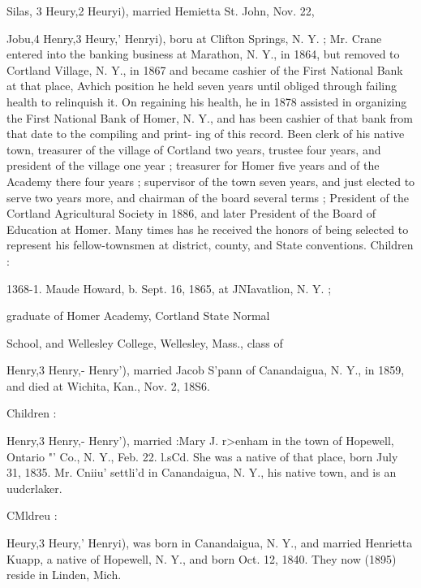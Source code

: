 \documentclass{book}
\begin{document}
Silas, 3 Heury,2 Heuryi), married Hemietta St. John, Nov. 22, 


Jobu,4 Henry,3 Heury,' Henryi), boru at Clifton Springs, N. Y. ; 
Mr. Crane entered into the banking business at Marathon, N. Y., 
in 1864, but removed to Cortland Village, N. Y., in 1867 and 
became cashier of the First National Bank at that place, Avhich 
position he held seven years until obliged through failing health 
to relinquish it. On regaining his health, he in 1878 assisted in 
organizing the First National Bank of Homer, N. Y., and has 
been cashier of that bank from that date to the compiling and print- 
ing of this record. Been clerk of his native town, treasurer of 
the village of Cortland two years, trustee four years, and president 
of the village one year ; treasurer for Homer five years and of the 
Academy there four years ; supervisor of the town seven years, 
and just elected to serve two years more, and chairman of the 
board several terms ; President of the Cortland Agricultural 
Society in 1886, and later President of the Board of Education 
at Homer. Many times has he received the honors of being 
selected to represent his fellow-townsmen at district, county, and 
State conventions. Children : 

1368-1. Maude Howard, b. Sept. 16, 1865, at JNIavatlion, N. Y. ; 

graduate of Homer Academy, Cortland State Normal 

School, and Wellesley College, Wellesley, Mass., class of 



Henry,3 Henry,- Henry'), married Jacob S'pann of Canandaigua, 
N. Y., in 1859, and died at Wichita, Kan., Nov. 2, 18S6. 

Children : 




Henry,3 Henry,- Henry'), married :Mary J. r>enham in the town 
of Hopewell, Ontario "' Co., N. Y., Feb. 22. l.sCd. She was a 
native of that place, born July 31, 1835. Mr. Cniiu' settli'd in 
Canandaigua, N. Y., his native town, and is an uudcrlaker. 





CMldreu : 





Heury,3 Heury,' Henryi), was born in Canandaigua, N. Y., and 
married Henrietta Kuapp, a native of Hopewell, N. Y., and born 
Oct. 12, 1840. They now (1895) reside in Linden, Mich. 
\end{document}
